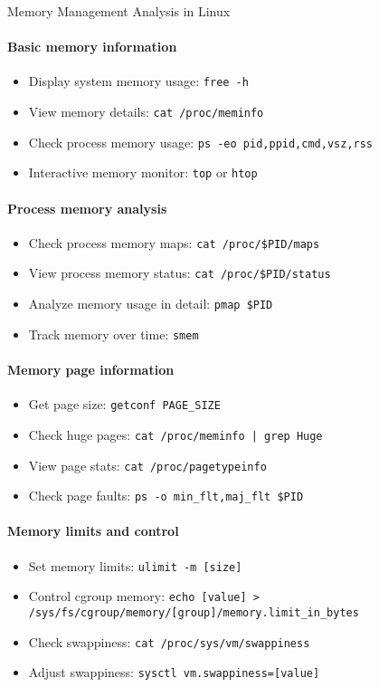\begin{KR}{Memory Management Analysis in Linux}
    \paragraph{Basic memory information}
    \begin{itemize}
        \item Display system memory usage: \texttt{free -h}
        \item View memory details: \texttt{cat /proc/meminfo}
        \item Check process memory usage: \texttt{ps -eo pid,ppid,cmd,vsz,rss}
        \item Interactive memory monitor: \texttt{top} or \texttt{htop}
    \end{itemize}
    
    \paragraph{Process memory analysis}
    \begin{itemize}
        \item Check process memory maps: \texttt{cat /proc/\$PID/maps}
        \item View process memory status: \texttt{cat /proc/\$PID/status}
        \item Analyze memory usage in detail: \texttt{pmap \$PID}
        \item Track memory over time: \texttt{smem}
    \end{itemize}
    
    \paragraph{Memory page information}
    \begin{itemize}
        \item Get page size: \texttt{getconf PAGE\_SIZE}
        \item Check huge pages: \texttt{cat /proc/meminfo | grep Huge}
        \item View page stats: \texttt{cat /proc/pagetypeinfo}
        \item Check page faults: \texttt{ps -o min\_flt,maj\_flt \$PID}
    \end{itemize}
    
    \paragraph{Memory limits and control}
    \begin{itemize}
        \item Set memory limits: \texttt{ulimit -m [size]}
        \item Control cgroup memory: \texttt{echo [value] > /sys/fs/cgroup/memory/[group]/memory.limit\_in\_bytes}
        \item Check swappiness: \texttt{cat /proc/sys/vm/swappiness}
        \item Adjust swappiness: \texttt{sysctl vm.swappiness=[value]}
    \end{itemize}
\end{KR}


